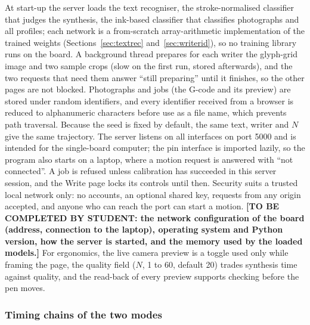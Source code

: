 At start-up the server loads the text recogniser, the stroke-normalised classifier that judges the synthesis, the ink-based classifier that classifies photographs and all profiles; each network is a from-scratch array-arithmetic implementation of the trained weights (Sections~\ref{sec:textrec} and~\ref{sec:writerid}), so no training library runs on the board.
A background thread prepares for each writer the glyph-grid image and two sample crops (slow on the first run, stored afterwards), and the two requests that need them answer ``still preparing'' until it finishes, so the other pages are not blocked.
Photographs and jobs (the G-code and its preview) are stored under random identifiers, and every identifier received from a browser is reduced to alphanumeric characters before use as a file name, which prevents path traversal.
Because the seed is fixed by default, the same text, writer and $N$ give the same trajectory.
The server listens on all interfaces on port 5000 and is intended for the single-board computer; the pin interface is imported lazily, so the program also starts on a laptop, where a motion request is answered with ``not connected''.
A job is refused unless calibration has succeeded in this server session, and the Write page locks its controls until then.
Security suits a trusted local network only: no accounts, an optional shared key, requests from any origin accepted, and anyone who can reach the port can start a motion.
\textbf{[TO BE COMPLETED BY STUDENT: the network configuration of the board (address, connection to the laptop), operating system and Python version, how the server is started, and the memory used by the loaded models.]}
For ergonomics, the live camera preview is a toggle used only while framing the page, the quality field ($N$, 1 to 60, default 20) trades synthesis time against quality, and the read-back of every preview supports checking before the pen moves.

\subsubsection{Timing chains of the two modes}

